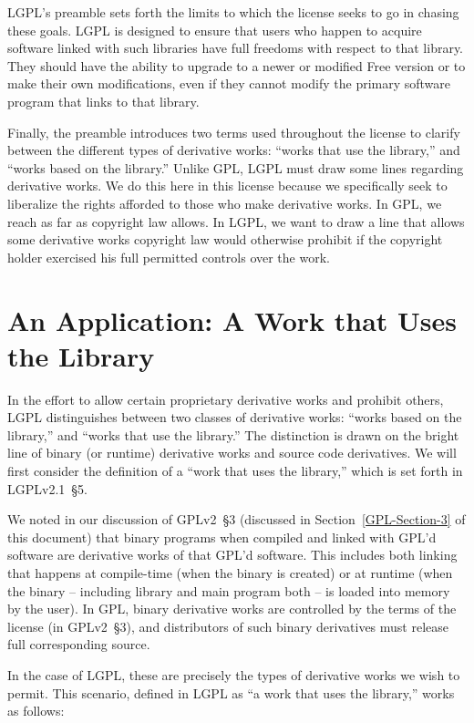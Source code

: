 LGPL's preamble sets forth the limits to which the license seeks to go in
chasing these goals. LGPL is designed to ensure that users who happen to
acquire software linked with such libraries have full freedoms with
respect to that library. They should have the ability to upgrade to a newer
or modified Free version or to make their own modifications, even if they
cannot modify the primary software program that links to that library.

Finally, the preamble introduces two terms used throughout the license to
clarify between the different types of derivative works: ``works that use
the library,'' and ``works based on the library.''  Unlike GPL, LGPL must
draw some lines regarding derivative works. We do this here in this
license because we specifically seek to liberalize the rights afforded to
those who make derivative works. In GPL, we reach as far as copyright law
allows. In LGPL, we want to draw a line that allows some derivative works
copyright law would otherwise prohibit if the copyright holder exercised
his full permitted controls over the work.

\section{An Application: A Work that Uses the Library}

In the effort to allow certain proprietary derivative works and prohibit
others, LGPL distinguishes between two classes of derivative works:
``works based on the library,'' and ``works that use the library.''  The
distinction is drawn on the bright line of binary (or runtime) derivative
works and source code derivatives. We will first consider the definition
of a ``work that uses the library,'' which is set forth in LGPLv2.1~\S5.

We noted in our discussion of GPLv2~\S3 (discussed in
Section~\ref{GPL-Section-3} of this document) that binary programs when
compiled and linked with GPL'd software are derivative works of that GPL'd
software. This includes both linking that happens at compile-time (when
the binary is created) or at runtime (when the binary -- including library
and main program both -- is loaded into memory by the user). In GPL,
binary derivative works are controlled by the terms of the license (in GPLv2~\S3),
and distributors of such binary derivatives must release full
corresponding source\@.

In the case of LGPL, these are precisely the types of derivative works
we wish to permit. This scenario, defined in LGPL as ``a work that uses
the library,'' works as follows:

